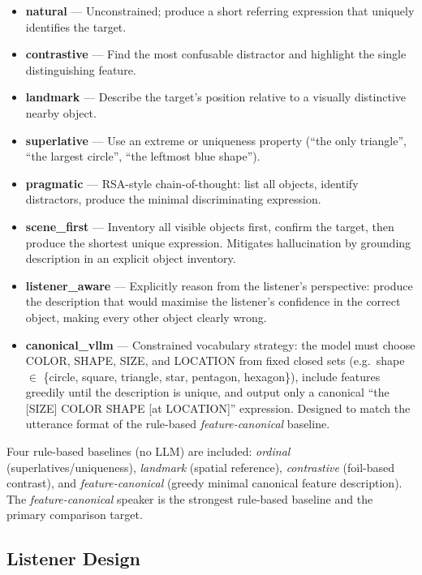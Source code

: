 \documentclass[11pt]{article}
\begin{document}
\begin{itemize}
    \item \textbf{natural} --- Unconstrained; produce a short referring expression
          that uniquely identifies the target.
    \item \textbf{contrastive} --- Find the most confusable distractor and
          highlight the single distinguishing feature.
    \item \textbf{landmark} --- Describe the target's position relative to a
          visually distinctive nearby object.
    \item \textbf{superlative} --- Use an extreme or uniqueness property
          (``the only triangle'', ``the largest circle'', ``the leftmost blue shape'').
    \item \textbf{pragmatic} --- RSA-style chain-of-thought: list all objects,
          identify distractors, produce the minimal discriminating expression.
    \item \textbf{scene\_first} --- Inventory all visible objects first, confirm
          the target, then produce the shortest unique expression.  Mitigates
          hallucination by grounding description in an explicit object inventory.
    \item \textbf{listener\_aware} --- Explicitly reason from the listener's
          perspective: produce the description that would maximise the listener's
          confidence in the correct object, making every other object clearly wrong.
    \item \textbf{canonical\_vllm} --- Constrained vocabulary strategy: the model
          must choose COLOR, SHAPE, SIZE, and LOCATION from fixed closed sets
          (e.g.\ shape $\in$ \{circle, square, triangle, star, pentagon, hexagon\}),
          include features greedily until the description is unique, and output
          only a canonical ``the [SIZE] COLOR SHAPE [at LOCATION]'' expression.
          Designed to match the utterance format of the rule-based
          \textit{feature-canonical} baseline.
\end{itemize}

Four rule-based baselines (no LLM) are included: \textit{ordinal}
(superlatives/uniqueness), \textit{landmark} (spatial reference),
\textit{contrastive} (foil-based contrast), and \textit{feature-canonical}
(greedy minimal canonical feature description).  The \textit{feature-canonical}
speaker is the strongest rule-based baseline and the primary comparison target.

\subsection{Listener Design}
\end{document}
